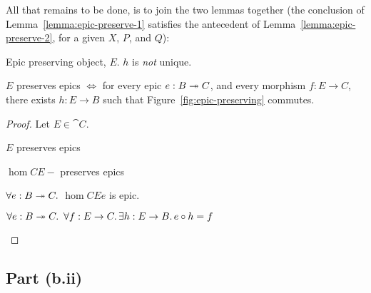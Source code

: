 All that remains to be done, is to join the two lemmas together (the conclusion of Lemma~\ref{lemma:epic-preserve-1} satisfies the antecedent of Lemma~\ref{lemma:epic-preserve-2}, for a given $X$, $P$, and $Q$):

\begin{marginfigure}
  \caption{Epic preserving object, $E$. $h$ is \textit{not} unique.}\label{fig:epic-preserving}
\end{marginfigure}

\begin{prop}\label{prop:epic-preserving}
  $E$ preserves epics $\iff$ for every epic $e : B \twoheadrightarrow C$, and every morphism $f : E \to C$, there exists $h : E \to B$ such that Figure~\ref{fig:epic-preserving} commutes.

  \begin{proof}
    Let $E\in\cat{C}$.
    \begin{itemize}
      \step
        $E$ preserves epics
        \marginnote{\Hyp}

      \step[\iffs]
        $\hom{C}{E}{-}$ preserves epics

      \step[\iffs]
        $\forall e : B \twoheadrightarrow C\ldotp$ $\hom{C}{E}{e}$ is epic.

      \step[\iffs]
        $\forall e : B\twoheadrightarrow C\ldotp~\forall f : E \to C\ldotp\exists h : E \to B\ldotp e\circ h = f$
        \qedhere
        \marginnote{\Lemma-\ref{lemma:epic-preserve-2}-(\Lemma-\ref{lemma:epic-preserve-1})}
    \end{itemize}
  \end{proof}
\end{prop}

\subsection{Part (b.ii)}\label{sec:q-1-b-ii}

